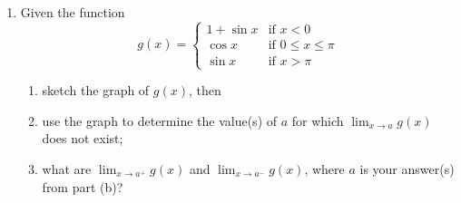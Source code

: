 \documentclass[12pt]{article}
\begin{document}
\begin{enumerate}
\item Given the function 
\[
g(x)=\begin{cases}
	1+\sin{x} & \text{if }x<0 \\
	\cos{x} & \text{if }0\leq x\leq\pi \\
	\sin{x} & \text{if }x>\pi
\end{cases}
\]
\begin{enumerate}
	\item sketch the graph of $g(x)$, then
	\item use the graph to determine the value(s) of $a$ for which $\lim_{x\to a}g(x)$ does not exist;
	\item what are $\lim_{x\to a^+}g(x)$ and $\lim_{x\to a^-}g(x)$, where $a$ is your answer(s) from part (b)?
\end{enumerate}


\end{enumerate}
\end{document}

